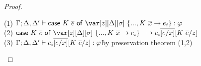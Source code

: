 \CaseOfKnownConstructorTheorem

\begin{proof}~
\begin{tabbing}
    (1) $\G; \D, \D' \vdash \ccase{K~\ov{e}}{\z[\D][\s]~\{..., K~\ov{x} \to e_i\}} : \vp$\\
    (2) $\ccase{K~\ov{e}}{\z[\D][\s]~\{..., K~\ov{x} \to e_i\}} \longrightarrow e_i\ov{[e/x]}[K~\ov{e}/z]$\\
    (3) $\Gamma; \Delta,\Delta' \vdash e_i\overline{[e/x]}[K~\overline{e}/z] : \varphi$\` by preservation theorem (1,2)\\
\end{tabbing}
\end{proof}


